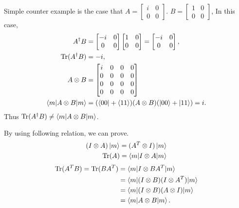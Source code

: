 \begin{itemize}
    Simple counter example is the case that 
    $A = \begin{bmatrix}
        i & 0\\
        0 & 0
    \end{bmatrix}$.
    $B = \begin{bmatrix}
        1 & 0\\
        0 & 0
    \end{bmatrix}$, 
    In this case,
    \begin{align*}
        A^\dagger B &=
        \begin{bmatrix}
            -i & 0\\
            0 & 0
        \end{bmatrix}
        \begin{bmatrix}
            1 & 0\\
            0 & 0
        \end{bmatrix}
        = \begin{bmatrix}
            -i & 0\\
            0 & 0
        \end{bmatrix},\\
%        
        \Tr (A^\dagger B)& = -i,\\
%        
        A \otimes B &= \begin{bmatrix}
            i & 0 & 0 & 0\\
            0 & 0 & 0 & 0\\
            0 & 0 & 0 & 0\\
            0 & 0 & 0 & 0
        \end{bmatrix}\\
        \braket{m | A \otimes B | m} &= (\bra{00} + \braket{11}) (A \otimes B) (\ket{00} + \ket{11}) = i.
    \end{align*}
    Thus $\operatorname{Tr}(A^\dagger B) \neq \braket{m | A \otimes B | m}$.
    
    By using following relation, we can prove.
    \begin{align*}
        (I \otimes A) \ket{m} = (A^T \otimes I) \ket{m}\\
        \operatorname{Tr} (A) = \braket{m | I \otimes A | m}
    \end{align*}
%    
    \begin{align*}
        \operatorname{Tr} (A^T B) = \operatorname{Tr}(BA^T) &= \braket{m | I \otimes BA^T |m}\\
            &= \braket{m | (I \otimes B)(I \otimes A^T) |m}\\
            &= \braket{m | (I \otimes B)(A \otimes I) |m}\\ 
            &= \braket{m | A \otimes B | m}.
    \end{align*}
\end{itemize}
